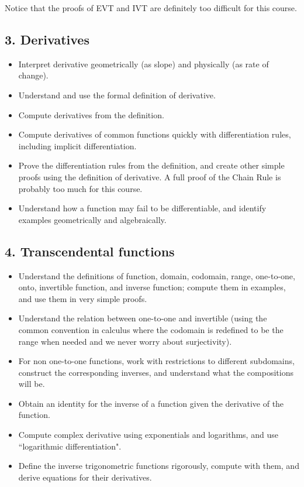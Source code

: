 \documentclass[11pt]{article}
\begin{document}
Notice that the proofs of EVT and IVT are definitely too difficult for this course.

\subsection{3. Derivatives} \label{unit3}

	\begin{itemize}
		\item  Interpret derivative geometrically (as slope) and physically (as rate of change).
		\item  Understand and use the formal definition of derivative.
		\item  Compute derivatives from the definition.
		\item  Compute derivatives of common functions quickly with differentiation rules, including implicit differentiation.
		\item  Prove the differentiation rules from the definition, and create other simple proofs using the definition of derivative.   A full proof of the Chain Rule is probably too much for this course.
		\item Understand how a function may fail to be differentiable, and identify examples geometrically and algebraically.
	\end{itemize}

\subsection{4. Transcendental functions} \label{unit4}

	\begin{itemize}
		\item  Understand the definitions of function, domain, codomain, range, one-to-one, onto, invertible function, and inverse function; compute them in examples, and use them in very simple proofs.    
		\item Understand the relation between one-to-one and invertible (using the common convention in calculus where the codomain is redefined to be the range when needed and we never worry about surjectivity).
		\item For non one-to-one functions, work with restrictions to different subdomains, construct the corresponding inverses, and understand what the compositions will be.
		\item Obtain an identity for the inverse of a function given the derivative of the function.
		\item Compute complex derivative using exponentials and logarithms, and use ``logarithmic differentiation".
		\item Define the inverse trigonometric functions rigorously, compute with them, and derive equations for their derivatives.
	\end{itemize}
\end{document}

